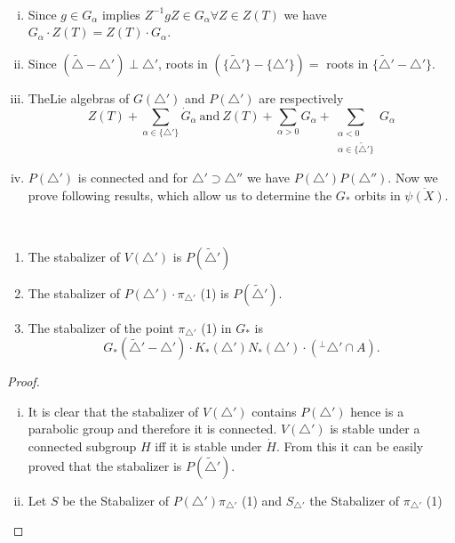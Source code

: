 \begin{remarks*}
~
  \begin{enumerate}[(i)]
    \item Since $g \in G_\alpha$ implies $Z^{-1} g Z \in G_\alpha
      \forall Z \in Z(T)$ we have $G_\alpha \cdot Z(T) = Z(T) \cdot
      G_\alpha$.
      \item Since $(\widetilde{\triangle}- \triangle')\perp \triangle'$, roots
        in $(\{ \widetilde{\triangle}'\} - \{ \triangle'\})=$ roots in
        $\{ \widetilde{\triangle}' - \triangle'\}$.
        \item The\pageoriginale Lie algebras of $G(\triangle')$ and $P(\triangle')$
          are respectively
          $$
          Z(T) +\sum_{\alpha \in \{ \triangle' \}} \dot{G}_\alpha
          ~\text{and}~ Z(T) + \sum_{\alpha > 0} G_\alpha +
          \sum_{\substack{\alpha< 0\\ \alpha \in \{
              \widetilde{\triangle}'\}}} G_\alpha
          $$
          \item $P (\triangle')$ is connected and for $\triangle'
            \supset \triangle''$ we have $P (\triangle') P
            (\triangle'')$. Now we prove following results, which
            allow us to determine the $G_*$ orbits in
            $\overline{\psi (X)}$.
  \end{enumerate}
\end{remarks*}

\begin{lemma} \label{chap2:lem2.8}
~
  \begin{enumerate}[\rm (i)]
    \item The stabalizer of $V (\triangle')$ is $P
      (\widetilde{\triangle}')$
      \item The stabalizer of $P (\triangle')\cdot \pi_{\triangle'}$
        (1) is $P(\widetilde{\triangle}')$.
        \item The stabalizer of the point $\pi_{\triangle'}$
          (1) in $G_*$ is 
          $$
          G_* (\widetilde{\triangle}'- \triangle') \cdot K_*
          (\triangle') N_* (\triangle') \cdot ({}^\perp \triangle'
          \cap A).
          $$
  \end{enumerate}
\end{lemma}

\begin{proof}
~
  \begin{enumerate}[(i)]
    \item It is clear that the stabalizer of $V(\triangle')$ contains
      $P(\triangle')$  hence is a parabolic group and therefore it is
      connected. $V(\triangle')$ is stable under a connected subgroup
      $H$ iff it is stable under $\dot{H}$. From this it can be easily
      proved that the stabalizer is $P(\widetilde{\triangle}')$.
      \item Let $S$ be the Stabalizer of $P(\triangle')
        \pi_{\triangle'}$ (1) and $S_{\triangle'}$
        the Stabalizer of $\pi_{\triangle'}$ (1)
  \end{enumerate}
\end{proof}

